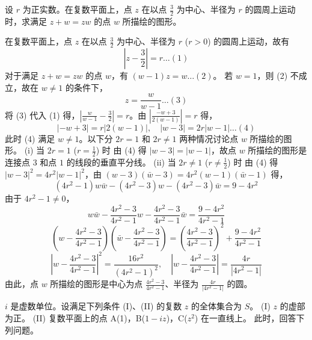 \begin{questions}
\question
设 $r$ 为正实数。在复数平面上，点 $z$ 在以点 $\frac{3}{2}$ 为中心、半径为 $r$ 的圆周上运动时，求满足 $z + w = zw$ 的点 $w$ 所描绘的图形。
\begin{solution}
在复数平面上，点 $z$ 在以点 $\frac{3}{2}$ 为中心、半径为 $r$ ($r > 0$) 的圆周上运动，故有
\[
\left| z - \frac{3}{2} \right| = r \dots (1)
\]
对于满足 $z + w = zw$ 的点 $w$，有 $(w - 1)z = w \dots (2)$。
若 $w = 1$，则 (2) 不成立，故在 $w \neq 1$ 的条件下，
\[
z = \frac{w}{w - 1} \dots (3)
\]
将 (3) 代入 (1) 得，$\left| \frac{w}{w - 1} - \frac{3}{2} \right| = r$。由 $\left| \frac{-w + 3}{2(w - 1)} \right| = r$ 得，
\[
|-w + 3| = r |2(w - 1)|, \quad |w - 3| = 2r |w - 1| \dots (4)
\]
此时 (4) 满足 $w \neq 1$。以下分 $2r = 1$ 和 $2r \neq 1$ 两种情况讨论点 $w$ 所描绘的图形。
(i) 当 $2r = 1$ ($r = \frac{1}{2}$) 时
由 (4) 得 $|w - 3| = |w - 1|$，故点 $w$ 所描绘的图形是连接点 $3$ 和点 $1$ 的线段的垂直平分线。
(ii) 当 $2r \neq 1$ ($r \neq \frac{1}{2}$) 时
由 (4) 得 $|w - 3|^2 = 4r^2 |w - 1|^2$，由 $(w - 3)(\bar{w} - 3) = 4r^2(w - 1)(\bar{w} - 1)$ 得，
\[
(4r^2 - 1)w\bar{w} - (4r^2 - 3)w - (4r^2 - 3)\bar{w} = 9 - 4r^2
\]
由于 $4r^2 - 1 \neq 0$，
\[
w\bar{w} - \frac{4r^2 - 3}{4r^2 - 1}w - \frac{4r^2 - 3}{4r^2 - 1}\bar{w} = \frac{9 - 4r^2}{4r^2 - 1}
\]
\[
\left( w - \frac{4r^2 - 3}{4r^2 - 1} \right)\left( \bar{w} - \frac{4r^2 - 3}{4r^2 - 1} \right) = \left( \frac{4r^2 - 3}{4r^2 - 1} \right)^2 + \frac{9 - 4r^2}{4r^2 - 1}
\]
\[
\left| w - \frac{4r^2 - 3}{4r^2 - 1} \right|^2 = \frac{16r^2}{(4r^2 - 1)^2}, \quad \left| w - \frac{4r^2 - 3}{4r^2 - 1} \right| = \frac{4r}{|4r^2 - 1|}
\]
由此，点 $w$ 所描绘的图形是中心为点 $\frac{4r^2 - 3}{4r^2 - 1}$、半径为 $\frac{4r}{|4r^2 - 1|}$ 的圆。
\end{solution}

\question
$i$ 是虚数单位。设满足下列条件 (I)、(II) 的复数 $z$ 的全体集合为 $S$。
(I) $z$ 的虚部为正。
(II) 复数平面上的点 A(1)，B($1 - iz$)，C($z^2$) 在一直线上。
此时，回答下列问题。
\end{questions}
